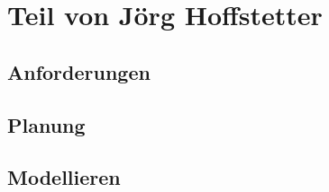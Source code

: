 \chapter{Teil von Jörg Hoffstetter}

\section{Anforderungen}

\section{Planung}

\section{Modellieren}